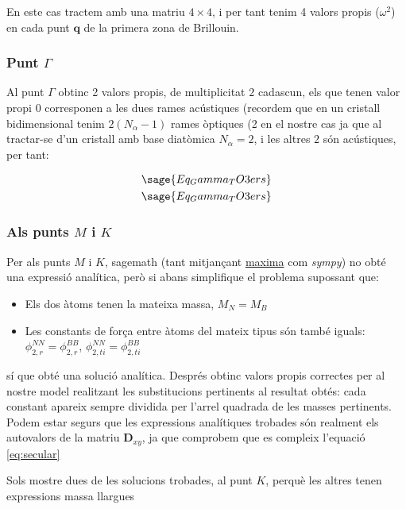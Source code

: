\documentclass[12pt]{article} %
\let\vec\mathbf %
\begin{document}
{En este cas tractem amb una matriu $4\times 4$, i per tant tenim 4 valors propis ($\omega^2$) en cada punt $\vec q$ de la primera zona de Brillouin.


\subsubsection{Punt $\Gamma$}

Al punt $\Gamma$ obtinc 2 valors propis, de multiplicitat $2$ cadascun, els que tenen valor propi $0$ corresponen a les dues rames acústiques (recordem que en un cristall bidimensional tenim $2(N_\alpha -1)$ rames òptiques (2 en el nostre cas ja que al tractar-se d'un cristall amb base diatòmica $N_\alpha=2$, i les altres $2$ són acústiques, per tant: 

\begin{equation}
 \begin{split}
\sage{Eq_Gamma_TO3ers}\\
\sage{Eq_Gamma_TO3ers}
 \end{split}
\end{equation}

\subsubsection{Als punts $M$ i $K$}

Per als punts $M$ i $K$, sagemath (tant mitjançant \href{https://maxima.sourceforge.io/}{maxima} com \textit{sympy}) no obté una expressió analítica, però si abans simplifique el problema supossant que: 

\begin{itemize}

\item Els dos àtoms tenen la mateixa massa, $M_N=M_B$
\item Les constants de for\c{c}a entre àtoms del mateix tipus són també iguals: $\phi_{2,r}^{NN}=\phi_{2,r}^{BB}$, $\phi_{2,ti}^{NN}=\phi_{2,ti}^{BB}$ 
\end{itemize}

sí que obté una solució analítica. Després obtinc valors propis correctes per al nostre model realitzant les substitucions pertinents al resultat obtés: cada constant apareix sempre dividida per l'arrel quadrada de les masses pertinents.
Podem estar segurs que les expressions analítiques trobades són  realment els autovalors de la matriu $\vec D_{xy}$, ja que comprobem que es compleix l'equació \ref{eq:secular}


Sols mostre dues de les solucions trobades, al punt $K$, perquè les altres tenen expressions massa llargues

}
\end{document}

